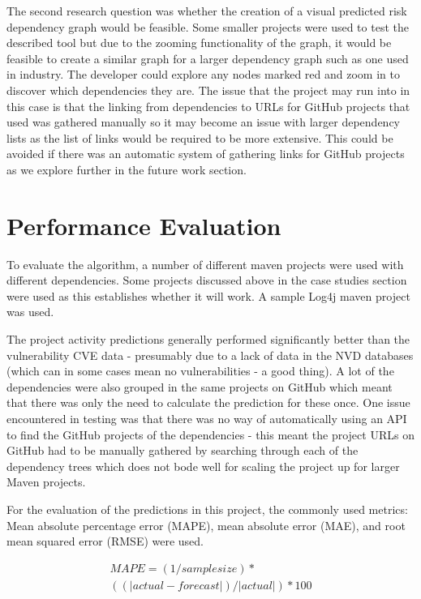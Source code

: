 \documentclass[conference]{IEEEtran}
\begin{document}
{The second research question was whether the creation of a visual predicted risk dependency graph would be feasible. Some smaller projects were used to test the described tool but due to the zooming functionality of the graph, it would be feasible to create a similar graph for a larger dependency graph such as one used in industry. The developer could explore any nodes marked red and zoom in to discover which dependencies they are. The issue that the project may run into in this case is that the linking from dependencies to URLs for GitHub projects that used was gathered manually so it may become an issue with larger dependency lists as the list of links would be required to be more extensive. This could be avoided if there was an automatic system of gathering links for GitHub projects as we explore further in the future work section. 

\section{Performance Evaluation}

To evaluate the algorithm, a number of different maven projects were used with different dependencies. Some projects discussed above in the case studies section were used as this establishes whether it will work. A sample Log4j maven project was used. 

The project activity predictions generally performed significantly better than the vulnerability CVE data - presumably due to a lack of data in the NVD databases (which can in some cases mean no vulnerabilities - a good thing). A lot of the dependencies were also grouped in the same projects on GitHub which meant that there was only the need to calculate the prediction for these once. One issue encountered in testing was that there was no way of automatically using an API to find the GitHub projects of the dependencies - this meant the project URLs on GitHub had to be manually gathered by searching through each of the dependency trees which does not bode well for scaling the project up for larger Maven projects. 

For the evaluation of the predictions in this project, the commonly used metrics: Mean absolute percentage error (MAPE), mean absolute error (MAE), and root mean squared error (RMSE) were used. 

\begin{multline*}
 MAPE  = (1 / sample size) * \\( ( |actual - forecast| ) / |actual| ) * 100 
\end{multline*}

}
\end{document}
